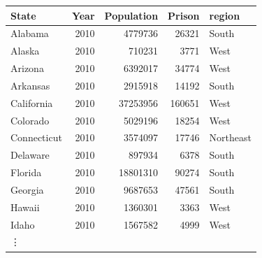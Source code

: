 \documentclass{exam}
\begin{document}
  \begin{table}[H]
    \centering
    \begin{tabular}{lrrrl}
      \toprule
      State       & Year & Population & Prison & region    \\
      \midrule
      Alabama     & 2010   & 4779736  & 26321  & South     \\
      Alaska      & 2010   & 710231   & 3771   & West      \\
      Arizona     & 2010   & 6392017  & 34774  & West      \\
      Arkansas    & 2010   & 2915918  & 14192  & South     \\
      California  & 2010   & 37253956 & 160651 & West      \\
      Colorado    & 2010   & 5029196  & 18254  & West      \\
      Connecticut & 2010   & 3574097  & 17746  & Northeast \\
      Delaware    & 2010   & 897934   & 6378   & South     \\
      Florida     & 2010   & 18801310 & 90274  & South     \\
      Georgia     & 2010   & 9687653  & 47561  & South     \\
      Hawaii      & 2010   & 1360301  & 3363   & West      \\
      Idaho       & 2010   & 1567582  & 4999   & West      \\
      \vdots      \\

\end{tabular}
\end{table}
\end{document}
